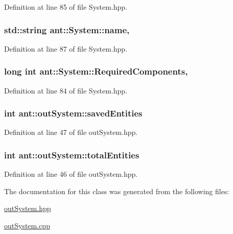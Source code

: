Definition at line 85 of file System.\+hpp.

\hypertarget{classant_1_1_system_a60b3c00a760a3b4947ab1f1fc534a5b2}{
\subsubsection[{name}]{\setlength{\rightskip}{0pt plus 5cm}std\+::string ant\+::\+System\+::name\hspace{0.3cm}{\ttfamily [protected]}, {\ttfamily [inherited]}}}\label{classant_1_1_system_a60b3c00a760a3b4947ab1f1fc534a5b2}


Definition at line 87 of file System.\+hpp.

\hypertarget{classant_1_1_system_a4ef41cfc496e41ac6730f90629524ec7}{
\subsubsection[{Required\+Components}]{\setlength{\rightskip}{0pt plus 5cm}long int ant\+::\+System\+::\+Required\+Components\hspace{0.3cm}{\ttfamily [protected]}, {\ttfamily [inherited]}}}\label{classant_1_1_system_a4ef41cfc496e41ac6730f90629524ec7}


Definition at line 84 of file System.\+hpp.

\hypertarget{classant_1_1out_system_af701a5815e678816eb1a32587373acd7}{
\subsubsection[{saved\+Entities}]{\setlength{\rightskip}{0pt plus 5cm}int ant\+::out\+System\+::saved\+Entities\hspace{0.3cm}{\ttfamily [private]}}}\label{classant_1_1out_system_af701a5815e678816eb1a32587373acd7}


Definition at line 47 of file out\+System.\+hpp.

\hypertarget{classant_1_1out_system_ac4f71f8c4634833fa70672b9738c2d87}{
\subsubsection[{total\+Entities}]{\setlength{\rightskip}{0pt plus 5cm}int ant\+::out\+System\+::total\+Entities\hspace{0.3cm}{\ttfamily [private]}}}\label{classant_1_1out_system_ac4f71f8c4634833fa70672b9738c2d87}


Definition at line 46 of file out\+System.\+hpp.



The documentation for this class was generated from the following files\+:\begin{DoxyCompactItemize}
\item 
\hyperlink{out_system_8hpp}{out\+System.\+hpp}\item 
\hyperlink{out_system_8cpp}{out\+System.\+cpp}\end{DoxyCompactItemize}
